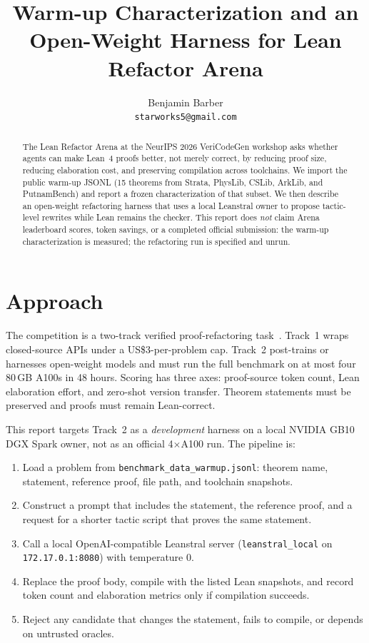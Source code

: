 \documentclass{article}
\title{Warm-up Characterization and an Open-Weight Harness for Lean Refactor Arena}
\author{%
  Benjamin Barber \\
  \texttt{starworks5@gmail.com} \\
}
\begin{document}
\maketitle

\begin{abstract}
The Lean Refactor Arena at the NeurIPS 2026 VeriCodeGen workshop asks whether agents can make Lean~4 proofs better, not merely correct, by reducing proof size, reducing elaboration cost, and preserving compilation across toolchains. We import the public warm-up JSONL (15 theorems from Strata, PhysLib, CSLib, ArkLib, and PutnamBench) and report a frozen characterization of that subset. We then describe an open-weight refactoring harness that uses a local Leanstral owner to propose tactic-level rewrites while Lean remains the checker. This report does \emph{not} claim Arena leaderboard scores, token savings, or a completed official submission: the warm-up characterization is measured; the refactoring run is specified and unrun.
\end{abstract}

\section{Approach}

The competition is a two-track verified proof-refactoring task~\cite{vericodegen2026,leanrefactorarena,leanrefactorsite}. Track~1 wraps closed-source APIs under a US\$3-per-problem cap. Track~2 post-trains or harnesses open-weight models and must run the full benchmark on at most four 80\,GB A100s in 48 hours. Scoring has three axes: proof-source token count, Lean elaboration effort, and zero-shot version transfer. Theorem statements must be preserved and proofs must remain Lean-correct.

This report targets Track~2 as a \emph{development} harness on a local NVIDIA GB10 DGX Spark owner, not as an official 4$\times$A100 run. The pipeline is:

\begin{enumerate}
  \item Load a problem from \texttt{benchmark\_data\_warmup.jsonl}: theorem name, statement, reference proof, file path, and toolchain snapshots.
  \item Construct a prompt that includes the statement, the reference proof, and a request for a shorter tactic script that proves the same statement.
  \item Call a local OpenAI-compatible Leanstral server (\texttt{leanstral\_local} on \texttt{172.17.0.1:8080}) with temperature 0.
  \item Replace the proof body, compile with the listed Lean snapshots, and record token count and elaboration metrics only if compilation succeeds.
  \item Reject any candidate that changes the statement, fails to compile, or depends on untrusted oracles.
\end{enumerate}
\end{document}
